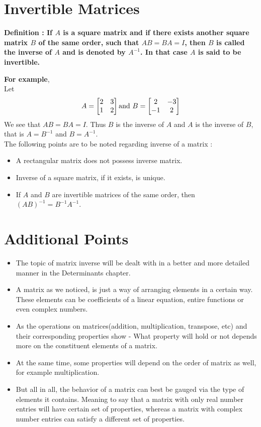 \documentclass[12pt, letterpaper]{article}
\begin{document}
\section{Invertible Matrices}
\begin{displayquote}
\textbf{Definition : If $A$ is a square matrix and if there exists another square matrix $B$ of the same order, such that $AB = BA = I$, then $B$ is called the inverse of $A$ and is denoted by $A^{-1}$. In that case $A$ is said to be invertible.}
\end{displayquote}
\textbf{For example},\\
Let 
\begin{displaymath}
A = \begin{bmatrix}
2 & 3\\
1 & 2
\end{bmatrix} \textnormal{and} \ B = \begin{bmatrix}
2 & -3\\
-1 & 2
\end{bmatrix}
\end{displaymath}
We see that $AB = BA = I$. Thus $B$ is the inverse of $A$ and $A$ is the inverse of $B$, that is $A = B^{-1}$ and $B = A^{-1}$.\\
The following points are to be noted regarding inverse of a matrix : 
\begin{itemize}
    \item A rectangular matrix does not possess inverse matrix. 
    \item Inverse of a square matrix, if it exists, is unique.
    \item If $A$ and $B$ are invertible matrices of the same order, then $(AB)^{-1} = B^{-1}A^{-1}$.
\end{itemize}

\section{Additional Points}
\begin{itemize}
    \item The topic of matrix inverse will be dealt with in a better and more detailed manner in the Determinants chapter.
    \item A matrix as we noticed, is just a way of arranging elements in a certain way. These elements can be coefficients of a linear equation, entire functions or even complex numbers.
    \item As the operations on matrices(addition, multiplication, transpose, etc) and their corresponding properties show - What property will hold or not depends more on the constituent elements of a matrix.
    \item At the same time, some properties will depend on the order of matrix as well, for example multiplication.
    \item But all in all, the behavior of a matrix can best be gauged via the type of elements it contains. Meaning to say that a matrix with only real number entries will have certain set of properties, whereas a matrix with complex number entries can satisfy a different set of properties.
\end{itemize}
\end{document}
